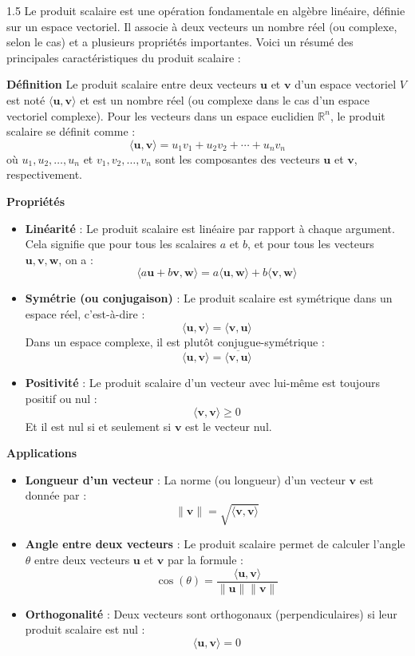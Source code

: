 \documentclass[12pt]{article}
\begin{document}
\begin{spacing}{1.5}
Le produit scalaire est une opération fondamentale en algèbre linéaire, définie sur un espace vectoriel. Il associe à deux vecteurs un nombre réel (ou complexe, selon le cas) et a plusieurs propriétés importantes. Voici un résumé des principales caractéristiques du produit scalaire :

\textbf{ Définition}
Le produit scalaire entre deux vecteurs \( \mathbf{u} \) et \( \mathbf{v} \) d'un espace vectoriel \( V \) est noté \( \langle \mathbf{u}, \mathbf{v} \rangle \) et est un nombre réel (ou complexe dans le cas d'un espace vectoriel complexe). Pour les vecteurs dans un espace euclidien \( \mathbb{R}^n \), le produit scalaire se définit comme :
\[
\langle \mathbf{u}, \mathbf{v} \rangle = u_1 v_1 + u_2 v_2 + \cdots + u_n v_n
\]
où \( u_1, u_2, \dots, u_n \) et \( v_1, v_2, \dots, v_n \) sont les composantes des vecteurs \( \mathbf{u} \) et \( \mathbf{v} \), respectivement.

\textbf{ Propriétés}

\begin{itemize}
    \item \textbf{Linéarité} : Le produit scalaire est linéaire par rapport à chaque argument. Cela signifie que pour tous les scalaires \( a \) et \( b \), et pour tous les vecteurs \( \mathbf{u}, \mathbf{v}, \mathbf{w} \), on a :
    \[
    \langle a\mathbf{u} + b\mathbf{v}, \mathbf{w} \rangle = a \langle \mathbf{u}, \mathbf{w} \rangle + b \langle \mathbf{v}, \mathbf{w} \rangle
    \]
    \item \textbf{Symétrie (ou conjugaison)} : Le produit scalaire est symétrique dans un espace réel, c'est-à-dire :
    \[
    \langle \mathbf{u}, \mathbf{v} \rangle = \langle \mathbf{v}, \mathbf{u} \rangle
    \]
    Dans un espace complexe, il est plutôt conjugue-symétrique :
    \[
    \langle \mathbf{u}, \mathbf{v} \rangle = \overline{\langle \mathbf{v}, \mathbf{u} \rangle}
    \]
    \item \textbf{Positivité} : Le produit scalaire d'un vecteur avec lui-même est toujours positif ou nul :
    \[
    \langle \mathbf{v}, \mathbf{v} \rangle \geq 0
    \]
    Et il est nul si et seulement si \( \mathbf{v} \) est le vecteur nul.
\end{itemize}

\textbf{ Applications}

\begin{itemize}
    \item \textbf{Longueur d'un vecteur} : La norme (ou longueur) d'un vecteur \( \mathbf{v} \) est donnée par :
    \[
    \|\mathbf{v}\| = \sqrt{\langle \mathbf{v}, \mathbf{v} \rangle}
    \]
    \item \textbf{Angle entre deux vecteurs} : Le produit scalaire permet de calculer l'angle \( \theta \) entre deux vecteurs \( \mathbf{u} \) et \( \mathbf{v} \) par la formule :
    \[
    \cos(\theta) = \frac{\langle \mathbf{u}, \mathbf{v} \rangle}{\|\mathbf{u}\| \|\mathbf{v}\|}
    \]
    \item \textbf{Orthogonalité} : Deux vecteurs sont orthogonaux (perpendiculaires) si leur produit scalaire est nul :
    \[
    \langle \mathbf{u}, \mathbf{v} \rangle = 0
    \]
\end{itemize}


\end{spacing}
\end{document}
